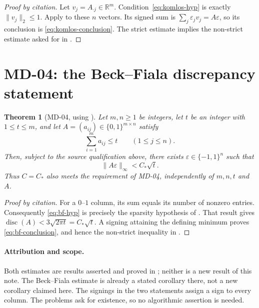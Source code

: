 \documentclass[11pt,a4paper]{article}
\newcommand{\R}{\mathbb{R}}
\DeclareMathOperator{\disc}{disc}
\newcommand{\Cstar}{C_{\!*}}
\newtheorem{theorem}{Theorem}
\begin{document}
\begin{proof}[Proof by citation]
Let $v_j=A_{\cdot j}\in\R^m$. Condition~\eqref{eq:komlos-hyp} is exactly
$\|v_j\|_2\leq1$. Apply \cite[Theorem~1.1, p.~1]{GFL26} to these $n$
vectors. Its signed sum is $\sum_j\varepsilon_jv_j=A\varepsilon$, so its
conclusion is \eqref{eq:komlos-conclusion}. The strict estimate implies
the non-strict estimate asked for in \cite{MD03}.
\end{proof}

\section{MD-04: the Beck--Fiala discrepancy statement}

\begin{theorem}[MD-04, using {\cite[Corollary~1.2]{GFL26}}]
Let $m,n\geq1$ be integers, let $t$ be an integer with $1\leq t\leq m$,
and let $A=(a_{ij})\in\{0,1\}^{m\times n}$ satisfy
\begin{equation}\label{eq:bf-hyp}
  \sum_{i=1}^{m}a_{ij}\leq t
  \qquad (1\leq j\leq n).
\end{equation}
Then, subject to the source qualification above, there exists
$\varepsilon\in\{-1,1\}^{n}$ such that
\begin{equation}\label{eq:bf-conclusion}
  \|A\varepsilon\|_{\infty}<\Cstar\sqrt{t}.
\end{equation}
Thus $C=\Cstar$ also meets the requirement of MD-04, independently of
$m,n,t$ and $A$.
\end{theorem}

\begin{proof}[Proof by citation]
For a $0$--$1$ column, its sum equals its number of nonzero entries.
Consequently \eqref{eq:bf-hyp} is precisely the sparsity hypothesis of
\cite[Corollary~1.2, p.~2]{GFL26}. That result gives
$\disc(A)<3\sqrt{2\pi t}=\Cstar\sqrt t$.
A signing attaining the defining minimum proves
\eqref{eq:bf-conclusion}, and hence the non-strict inequality in
\cite{MD04}.
\end{proof}

\paragraph{Attribution and scope.}
Both estimates are results asserted and proved in \cite{GFL26}; neither
is a new result of this note. The Beck--Fiala estimate is already a
stated corollary there, not a new corollary claimed here. The signings
in the two statements assign a sign to every column. The problems
\cite{MD03,MD04} ask for existence, so no algorithmic assertion is needed.
\end{document}
